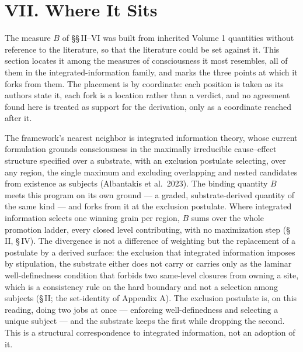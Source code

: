 \documentclass[11pt,oneside]{report}
\theoremstyle{definition}
\theoremstyle{remark}
\begin{document}
\section*{VII. Where It Sits}

The measure $B$ of \S\S\,II--VI was built from inherited Volume 1 quantities without reference to the literature, so that the literature could be set against it. This section locates it among the measures of consciousness it most resembles, all of them in the integrated-information family, and marks the three points at which it forks from them. The placement is by coordinate: each position is taken as its authors state it, each fork is a location rather than a verdict, and no agreement found here is treated as support for the derivation, only as a coordinate reached after it.

The framework's nearest neighbor is integrated information theory, whose current formulation grounds consciousness in the maximally irreducible cause--effect structure specified over a substrate, with an exclusion postulate selecting, over any region, the single maximum and excluding overlapping and nested candidates from existence as subjects (Albantakis et al.\ 2023). The binding quantity $B$ meets this program on its own ground --- a graded, substrate-derived quantity of the same kind --- and forks from it at the exclusion postulate. Where integrated information selects one winning grain per region, $B$ sums over the whole promotion ladder, every closed level contributing, with no maximization step (\S\,II, \S\,IV). The divergence is not a difference of weighting but the replacement of a postulate by a derived surface: the exclusion that integrated information imposes by stipulation, the substrate either does not carry or carries only as the laminar well-definedness condition that forbids two same-level closures from owning a site, which is a consistency rule on the hard boundary and not a selection among subjects (\S\,II; the set-identity of Appendix A). The exclusion postulate is, on this reading, doing two jobs at once --- enforcing well-definedness and selecting a unique subject --- and the substrate keeps the first while dropping the second. This is a structural correspondence to integrated information, not an adoption of it.
\end{document}
